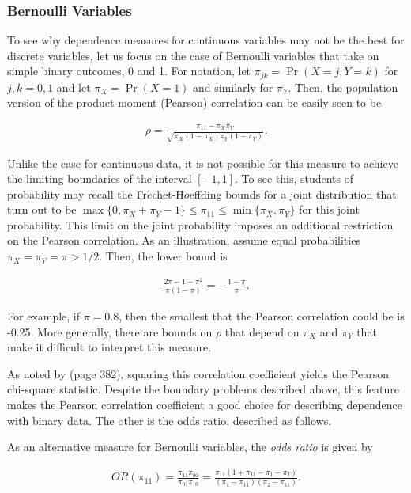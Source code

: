 \documentclass[]{book}
\theoremstyle{definition}
\theoremstyle{definition}
\theoremstyle{definition}
\theoremstyle{remark}
\begin{document}
\subsubsection{Bernoulli Variables}\label{bernoulli-variables}

To see why dependence measures for continuous variables may not be the
best for discrete variables, let us focus on the case of Bernoulli
variables that take on simple binary outcomes, 0 and 1. For notation,
let \(\pi_{jk} = \Pr(X=j, Y=k)\) for \(j,k=0,1\) and let
\(\pi_X=\Pr(X=1)\) and similarly for \(\pi_Y\). Then, the population
version of the product-moment (Pearson) correlation can be easily seen
to be

\begin{eqnarray*}
\rho = \frac{\pi_{11} - \pi_X \pi_Y}{\sqrt{\pi_X(1-\pi_X)\pi_Y(1-\pi_Y)}} .
\end{eqnarray*}

Unlike the case for continuous data, it is not possible for this measure
to achieve the limiting boundaries of the interval \([-1,1]\). To see
this, students of probability may recall the
Fr\(\acute{e}\)chet-H\(\ddot{o}\)effding bounds for a joint distribution
that turn out to be
\(\max\{0, \pi_X+\pi_Y-1\} \le \pi_{11} \le \min\{\pi_X,\pi_Y\}\) for
this joint probability. This limit on the joint probability imposes an
additional restriction on the Pearson correlation. As an illustration,
assume equal probabilities \(\pi_X =\pi_Y = \pi > 1/2\). Then, the lower
bound is

\begin{eqnarray*}
\frac{2\pi - 1 - \pi^2}{\pi(1-\pi)} = -\frac{1-\pi}{\pi} .
\end{eqnarray*}

For example, if \(\pi=0.8\), then the smallest that the Pearson
correlation could be is -0.25. More generally, there are bounds on
\(\rho\) that depend on \(\pi_X\) and \(\pi_Y\) that make it difficult
to interpret this measure.

As noted by \citep{bishop1975discrete} (page 382), squaring this
correlation coefficient yields the Pearson chi-square statistic. Despite
the boundary problems described above, this feature makes the Pearson
correlation coefficient a good choice for describing dependence with
binary data. The other is the odds ratio, described as follows.

As an alternative measure for Bernoulli variables, the \emph{odds ratio}
is given by

\begin{eqnarray*}
OR(\pi_{11}) = \frac{\pi_{11} \pi_{00}}{\pi_{01} \pi_{10}} = \frac{\pi_{11} \left( 1+\pi_{11}-\pi_1 -\pi_2\right)}{(\pi_1-\pi_{11})(\pi_2- \pi_{11})} .
\end{eqnarray*}
\end{document}
